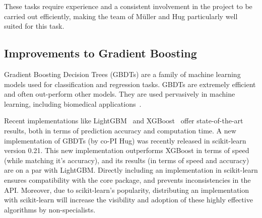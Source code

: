 \documentclass[11pt]{article}  %
\begin{document}
These tasks require experience and a consistent involvement in the project
to be carried out efficiently, making the team of M\"uller and Hug
particularly well suited for this task.

\subsection{Improvements to Gradient Boosting}

Gradient Boosting Decision Trees (GBDTs) are a family of machine learning
models used for classification and regression tasks. GBDTs are extremely
efficient and often out-perform other models. They are used pervasively in
machine learning, including biomedical applications~\cite{chen2019hiv, shah2019development}.

Recent implementations like LightGBM~\cite{LightGBM} and XGBoost~\cite{XGB}
offer state-of-the-art results, both in terms of prediction accuracy and
computation time.
A new implementation of GBDTs (by co-PI Hug) was recently
released in scikit-learn version 0.21. This new implementation
outperforms XGBoost in terms of speed (while matching it's accuracy), and its results (in terms of speed and accuracy)
are on a par with LightGBM. Directly including an implementation in scikit-learn ensures compatibility with the core package, and prevents inconsistencies in the API. Moreover, due to scikit-learn's popularity, distributing an implementation with scikit-learn will increase the visibility and adoption of these highly effective algorithms by non-specialists.
\end{document}

